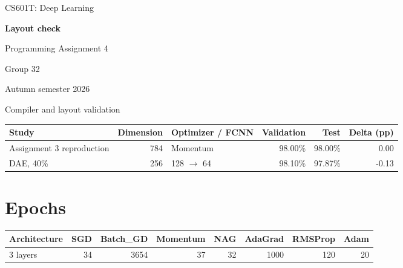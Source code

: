 \documentclass[11pt,a4paper]{article}
\begin{document}
\begin{titlepage}\thispagestyle{empty}

{\color{accent}\large CS601T: Deep Learning}\par\vspace{24mm}

{\color{ink}\Huge\bfseries Layout check}\par\vspace{8mm}

{\LARGE Programming Assignment 4}\par\vspace{4mm}

{\Large Group 32}\par\vspace{5mm}

{\large Autumn semester 2026}\par\vspace{10mm}

Compiler and layout validation


\begingroup\small\setlength{\tabcolsep}{5pt}

\begin{tabularx}{\linewidth}{Yrlrrr}

\toprule

\textbf{Study} & \textbf{Dimension} & \textbf{Optimizer / FCNN} & \textbf{Validation} & \textbf{Test} & \textbf{Delta (pp)} \\

\midrule

Assignment 3 reproduction & 784 & Momentum & 98.00\% & 98.00\% & 0.00 \\

DAE, 40\% & 256 & 128 $\to$ 64 & 98.10\% & 97.87\% & -0.13 \\

\bottomrule\end{tabularx}\endgroup\par\medskip

\vfill\end{titlepage}

\clearpage

\section{Epochs}

\begingroup\scriptsize\setlength{\tabcolsep}{5pt}

\begin{tabularx}{\linewidth}{Yrrrrrrr}

\toprule

\textbf{Architecture} & \textbf{SGD} & \textbf{Batch\_GD} & \textbf{Momentum} & \textbf{NAG} & \textbf{AdaGrad} & \textbf{RMSProp} & \textbf{Adam} \\

\midrule

3 layers & 34 & 3654 & 37 & 32 & 1000 & 120 & 20 \\

\bottomrule\end{tabularx}\endgroup\par\medskip
\end{document}
